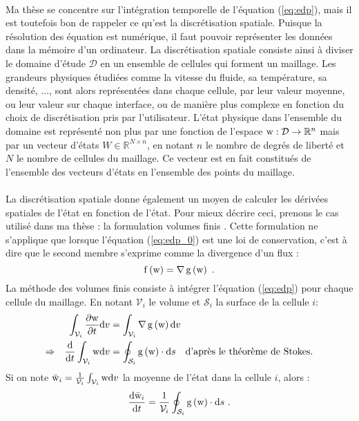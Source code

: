 		\paragraph{}
		Ma thèse se concentre sur l'intégration temporelle de l'équation (\ref{eq:edp}), mais il est toutefois bon de rappeler ce qu'est la discrétisation spatiale.
		Puisque la résolution des équation est numérique, il faut pouvoir représenter les données dans la mémoire d'un ordinateur.
		La discrétisation spatiale consiste ainsi à diviser le domaine d'étude $\mathcal{D}$ en un ensemble de cellules qui forment un maillage.
		Les grandeurs physiques étudiées comme la vitesse du fluide, sa température, sa densité, ..., sont alors représentées dans chaque cellule, par leur valeur moyenne, ou leur valeur sur chaque interface, ou de manière plus complexe en fonction du choix de discrétisation pris par l'utilisateur.
		L'état physique dans l'ensemble du domaine est représenté non plus par une fonction de l'espace $\textup{w} : \mathcal{D} \rightarrow \mathbb{R}^n$ mais par un vecteur d'états $W \in \mathbb{R}^{N\times n}$, en notant $n$ le nombre de degrés de liberté et $N$ le nombre de cellules du maillage.
		Ce vecteur est en fait constitués de l'ensemble des vecteurs d'états en l'ensemble des points du maillage.

		\paragraph{}
		La discrétisation spatiale donne également un moyen de calculer les dérivées spatiales de l'état en fonction de l'état.
		Pour mieux décrire ceci, prenons le cas utilisé dans ma thèse : la formulation volumes finis \cite{EymardGallouetHerbin2000}.
		Cette formulation ne s'applique que lorsque l'équation (\ref{eq:edp_0}) est une loi de conservation, c'est à dire que le second membre s'exprime comme la divergence d'un flux :
		\[\operatorname{f}\left(\textup{w}\right) = \nabla\operatorname{g}\left(\textup{w}\right)\ .\]
		La méthode des volumes finis consiste à intégrer l'équation (\ref{eq:edp}) pour chaque cellule du maillage.
		En notant $\mathcal{V}_i$ le volume et $\mathcal{S}_i$ la surface de la cellule $i$:
		\begin{align*}
			&&\int_{\mathcal{V}_i}\frac{\partial\textup{w}}{\partial t}\mathrm{d}v &= \int_{\mathcal{V}_i}\nabla\operatorname{g}\left(\textup{w}\right)\mathrm{d}v \\
			\Rightarrow&&\frac{\mathrm{d}}{\mathrm{d}t}\int_{\mathcal{V}_i}\textup{w}\mathrm{d}v &= \oint_{\mathcal{S}_i}\operatorname{g}\left(\textup{w}\right)\cdot\mathrm{d}s\quad\textrm{d'après le théorème de Stokes.}
		\end{align*}
		Si on note $\bar{\textup{w}}_i = \frac{1}{\mathcal{V}_i}\int_{\mathcal{V}_i}\textup{w}\mathrm{d}v$ la moyenne de l'état dans la cellule $i$, alors :
		\[\frac{\mathrm{d}\bar{\textup{w}}_i}{\mathrm{d}t} = \frac{1}{\mathcal{V}_i}\oint_{\mathcal{S}_i}\operatorname{g}\left(\textup{w}\right)\cdot\mathrm{d}s\ .\]

